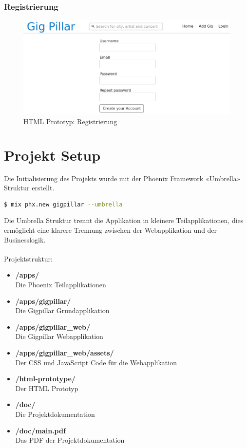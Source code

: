 \clearpage
\subsubsection{Registrierung}

\begin{figure}[!htb]
  \centering
  \includegraphics[width=1\textwidth]{realisierung/html-proto-signup.png}
  \caption{HTML Prototyp: Registrierung}
\end{figure}

\clearpage
\section{Projekt Setup}

Die Initialisierung des Projekts wurde mit der Phoenix Framework «Umbrella»
Struktur erstellt.

\begin{lstlisting}[language=bash,frame=single]
$ mix phx.new gigpillar --umbrella
\end{lstlisting}

Die Umbrella Struktur trennt die Applikation in kleinere Teilapplikationen,
dies ermöglicht eine klarere Trennung zwischen der Webapplikation und der Businesslogik.\\
\\
\noindent{}Projektstruktur:
\begin{itemize}
  \tightlist{}
  \item{} \textbf{/apps/}\\Die Phoenix Teilapplikationen
  \item{} \textbf{/apps/gigpillar/}\\Die Gigpillar Grundapplikation
  \item{} \textbf{/apps/gigpillar\_web/}\\Die Gigpillar Webapplikation
  \item{} \textbf{/apps/gigpillar\_web/assets/}\\Der CSS und JavaScript Code für die Webapplikation
  \item{} \textbf{/html-prototype/}\\Der HTML Prototyp
  \item{} \textbf{/doc/}\\Die Projektdokumentation
  \item{} \textbf{/doc/main.pdf}\\Das PDF der Projektdokumentation
\end{itemize}

